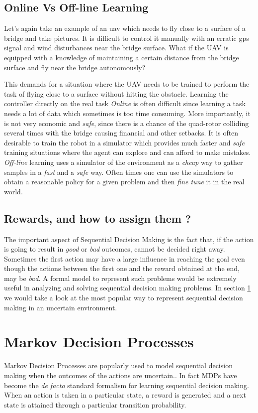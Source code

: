 \documentclass[12pt]{report}
\begin{document}
\subsection{Online Vs Off-line Learning}
Let's again take an example of an \gls{uav} which needs to fly close to a surface of a bridge and take pictures. It is difficult to control it manually with an erratic \gls{gps} signal and wind disturbances near the bridge surface. What if the UAV is equipped with a knowledge of maintaining a certain distance from the bridge surface and fly near the bridge autonomously? \par This demands for a situation where the UAV needs to be trained to perform the task of flying close to a surface without hitting the obstacle. Learning the controller directly on the real task \textit{Online} is often difficult since learning a task needs a lot of data which sometimes is too time consuming. More importantly, it is not very economic and \textit{safe}, since there is a chance of the quad-rotor colliding several times with the bridge causing financial and other setbacks. It is often desirable to train the robot in a simulator which provides much faster and \textit{safe} training situations where the agent can explore and can afford to make mistakes. \textit{Off-line} learning uses a simulator of the environment as a \textit{cheap} way to gather samples in a \textit{fast} and a \textit{safe} way. Often times one can use the simulators to obtain a reasonable policy for a given problem and then \textit{fine tune} it in the real world.

\subsection{Rewards, and how to assign them ?}
The important aspect of Sequential Decision Making is the fact that, if the action is going to result in \textit{good} or \textit{bad} outcomes, cannot be decided right away. Sometimes the first action may have a large influence in reaching the goal even though the actions between the first one and the reward obtained at the end, may be \textit{bad}. A formal model to represent such problems would be extremely useful in analyzing and solving sequential decision making problems. In section \ref{mdp} we would take a look at the most popular way to represent sequential decision making in an uncertain environment.

\section{Markov Decision Processes}
\label{mdp}
Markov Decision Processes are popularly used to model sequential decision making when the outcomes of the actions are uncertain.\cite{puterman2014markov}. In fact MDPs have become the \textit{de facto} standard formalism for learning sequential decision making. When an action is taken in a particular state, a reward is generated and a next state is attained through a particular transition probability.
\end{document}
